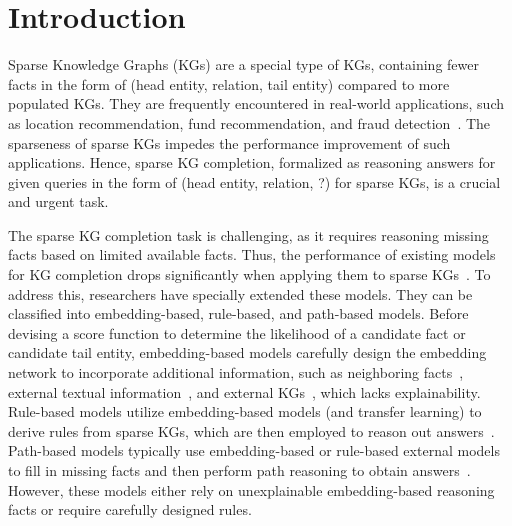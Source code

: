 \documentclass[sigconf]{acmart}
\begin{document}
\section{Introduction}
\label{sec:introduction}
Sparse Knowledge Graphs (KGs) are a special type of KGs, containing fewer facts in the form of (head entity, relation, tail entity) compared to more populated KGs. They are frequently encountered in real-world applications, such as location recommendation, fund recommendation, and fraud detection~\cite{POI_recommand2019,POI_recommand2020,CIKM-App-Recommend,fraud_prediction2023}. The sparseness of sparse KGs impedes the performance improvement of such applications. Hence, sparse KG completion, formalized as reasoning answers for given queries in the form of (head entity, relation, ?) for sparse KGs, is a crucial and urgent task.

The sparse KG completion task is challenging, as it requires reasoning missing facts based on limited available facts. Thus, the performance of existing models for KG completion drops significantly when applying them to sparse KGs~\cite{pujara-2017-sparsity,DacKGR,SKGC2023-KRACL,SKGC2023-RelaGraph}. To address this, researchers have specially extended these models. They can be classified into embedding-based, rule-based, and path-based models. Before devising a score function to determine the likelihood of a candidate fact or candidate tail entity, embedding-based models carefully design the embedding network to incorporate additional information, such as neighboring facts~\cite{SKGC2023-RelaGraph,SKGC2023-KRACL}, external textual information~\cite{SKGC2022-BERT,VEM2L}, and external KGs~\cite{SKG2023-Application}, which lacks explainability. Rule-based models utilize embedding-based models (and transfer learning) to derive rules from sparse KGs, which are then employed to reason out answers~\cite{SKGC2020-Structure,Rule-SKGC-2019,Rule-SKGC-2023}. Path-based models typically use embedding-based or rule-based external models to fill in missing facts and then perform path reasoning to obtain answers~\cite{DacKGR,SparKGR,Hi-KnowE}. However, these models either rely on unexplainable embedding-based reasoning facts or require carefully designed rules.
\end{document}
